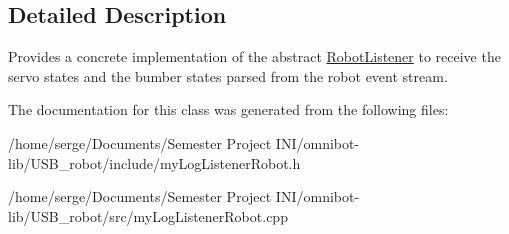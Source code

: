 \subsection{Detailed Description}
Provides a concrete implementation of the abstract \hyperlink{class_robot_listener}{Robot\+Listener} to receive the servo states and the bumber states parsed from the robot event stream. 

The documentation for this class was generated from the following files\+:\begin{DoxyCompactItemize}
\item 
/home/serge/\+Documents/\+Semester Project I\+N\+I/omnibot-\/lib/\+U\+S\+B\+\_\+robot/include/my\+Log\+Listener\+Robot.\+h\item 
/home/serge/\+Documents/\+Semester Project I\+N\+I/omnibot-\/lib/\+U\+S\+B\+\_\+robot/src/my\+Log\+Listener\+Robot.\+cpp\end{DoxyCompactItemize}
